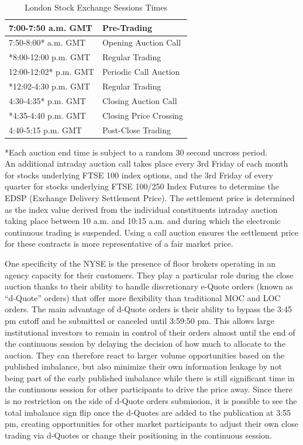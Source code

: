 \begin{table}[!ht]
   \centering
   \caption{London Stock Exchange Sessions Times\label{tab:LSEclose}}
   \begin{tabular}{ll} 
	7:00-7:50 a.m. GMT & Pre-Trading  \\ \hline
	7:50-8:00* a.m. GMT & Opening Auction Call\\ \hline
	*8:00-12:00 p.m. GMT & Regular Trading \\ \hline
	12:00-12:02* p.m. GMT & Periodic Call Auction \\ \hline
	*12:02-4:30 p.m. GMT & Regular Trading \\ \hline
	4:30-4:35* p.m. GMT & Closing Auction Call \\ \hline
	*4:35-4:40 p.m. GMT & Closing Price Crossing \\ \hline	
	4:40-5:15 p.m. GMT & Post-Close Trading
   \end{tabular}
\begin{minipage}[t]{1\textwidth}
\small{*Each auction end time is subject to a random 30 second uncross period.\\}
\small{An additional intraday auction call takes place every 3rd Friday of each month for stocks underlying FTSE 100 index options, and the 3rd Friday of every quarter for stocks underlying FTSE 100/250 Index Futures to determine the EDSP (Exchange Delivery Settlement Price). The settlement price is determined as the index value derived from the individual constituents intraday auction taking place between 10 a.m. and 10:15 a.m. and during which the electronic continuous trading is suspended. Using a call auction ensures the settlement price for these contracts is more representative of a fair market price.}
\end{minipage}   
\end{table}	

One specificity of the NYSE is the presence of floor brokers operating in an agency capacity for their customers. They play a particular role during the close auction thanks to their ability to handle discretionary e-Quote orders (known as ``d-Quote'' orders) that offer more flexibility than traditional MOC and LOC orders. The main advantage of d-Quote orders is their ability to bypass the 3:45 pm cutoff and be submitted or canceled until 3:59:50 pm. This allows large institutional investors to remain in control of their orders almost until the end of the continuous session by delaying the decision of how much to allocate to the auction. They can therefore react to larger volume opportunities based on the published imbalance, but also minimize their own information leakage by not being part of the early published imbalance while there is still significant time in the continuous session for other participants to drive the price away.  Since there is no restriction on the side of d-Quote orders submission, it is possible to see the total imbalance sign flip once the d-Quotes are added to the publication at 3:55 pm, creating opportunities for other market participants to adjust their own close trading via d-Quotes or change their positioning in the continuous session. \\


